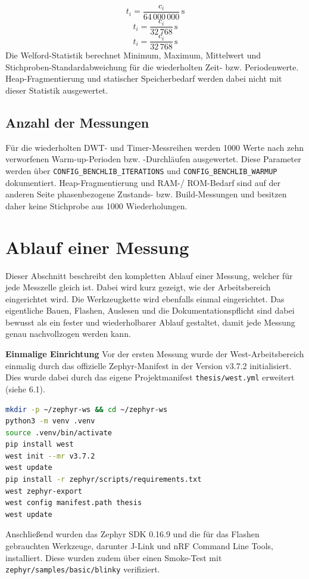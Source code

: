 \[t_i = \frac{c_i}{64\,000\,000}\,\mathrm{s}\]
\[t_i = \frac{c_i}{32\,768}\,\mathrm{s}\]
\[t_i = \frac{c_i}{32\,768}\,\mathrm{s}\]
Die Welford-Statistik berechnet Minimum, Maximum, Mittelwert und Stichproben-Standardabweichung für die wiederholten Zeit- bzw. Periodenwerte. Heap-Fragmentierung und statischer Speicherbedarf werden dabei nicht mit dieser Statistik ausgewertet.

\subsection{Anzahl der Messungen}
Für die wiederholten DWT- und Timer-Messreihen werden 1000 Werte nach zehn verworfenen Warm-up-Perioden bzw. -Durchläufen ausgewertet. Diese Parameter werden über \lstinline[style=fileinline]|CONFIG_BENCHLIB_ITERATIONS| und \lstinline[style=fileinline]|CONFIG_BENCHLIB_WARMUP| dokumentiert. Heap-Fragmentierung und RAM-/ ROM-Bedarf sind auf der anderen Seite phasenbezogene Zustands- bzw. Build-Messungen und besitzen daher keine Stichprobe aus 1000 Wiederholungen.

\section{Ablauf einer Messung}
Dieser Abschnitt beschreibt den kompletten Ablauf einer Messung, welcher für jede Messzelle gleich ist. Dabei wird kurz gezeigt, wie der Arbeitsbereich eingerichtet wird. Die Werkzeugkette wird ebenfalls einmal eingerichtet. Das eigentliche Bauen, Flashen, Auslesen und die Dokumentationspflicht sind dabei bewusst als ein fester und wiederholbarer Ablauf gestaltet, damit jede Messung genau nachvollzogen werden kann.

\textbf{Einmalige Einrichtung }Vor der ersten Messung wurde der West-Arbeitsbereich einmalig durch das offizielle Zephyr-Manifest in der Version v3.7.2 initialisiert. Dies wurde dabei durch das eigene Projektmanifest \lstinline[style=fileinline]|thesis/west.yml| erweitert (siehe 6.1).

\begin{lstlisting}[style=basecode,language=bash]
mkdir -p ~/zephyr-ws && cd ~/zephyr-ws
python3 -m venv .venv
source .venv/bin/activate
pip install west
west init --mr v3.7.2
west update
pip install -r zephyr/scripts/requirements.txt
west zephyr-export
west config manifest.path thesis
west update
\end{lstlisting}
Anschließend wurden das Zephyr SDK 0.16.9 und die für das Flashen gebrauchten Werkzeuge, darunter J-Link und nRF Command Line Tools, installiert. Diese wurden zudem über einen Smoke-Test mit \lstinline[style=fileinline]|zephyr/samples/basic/blinky| verifiziert.

